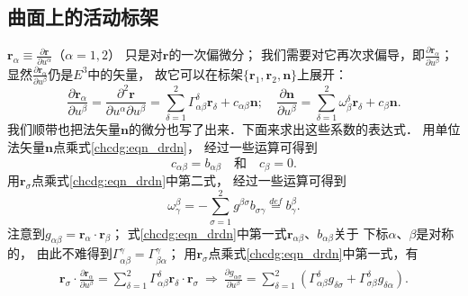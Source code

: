 \subsection{曲面上的活动标架}
$\boldsymbol{r}_\alpha\equiv \frac{\partial \boldsymbol{r}}{\partial u^\alpha}$（$\alpha=1,2$）
只是对$\boldsymbol{r}$的一次偏微分；
我们需要对它再次求偏导，即$\frac{\partial \boldsymbol{r}_\alpha}{\partial u^\beta}$；
显然$\frac{\partial \boldsymbol{r}_\alpha}{\partial u^\beta}$仍是$E^3$中的矢量，
故它可以在标架$\{\boldsymbol{r}_1,\boldsymbol{r}_2,\boldsymbol{n}\}$上展开：
\begin{equation}\label{chcdg:eqn_drdn}
    \frac{\partial \boldsymbol{r}_\alpha}{\partial u^\beta} 
    =\frac{\partial^2 \boldsymbol{r}}{\partial u^\alpha\partial u^\beta}
    = \sum_{\delta=1}^{2} \Gamma_{\alpha \beta}^\delta \boldsymbol{r}_\delta
     + c_{\alpha \beta} \boldsymbol{n};\quad
    \frac{\partial \boldsymbol{n}}{\partial u^\beta}
     = \sum_{\delta=1}^{2} \omega^\delta_\beta \boldsymbol{r}_\delta
     + c_\beta \boldsymbol{n} .
\end{equation}
我们顺带也把法矢量$\boldsymbol{n}$的微分也写了出来．下面来求出这些系数的表达式．
用单位法矢量$\boldsymbol{n}$点乘式\eqref{chcdg:eqn_drdn}，
经过一些运算可得到
\begin{equation}
    c_{\alpha\beta} = b_{\alpha\beta}  \quad\text{和}\quad c_\beta=0.
\end{equation}
用$\boldsymbol{r}_\sigma$点乘式\eqref{chcdg:eqn_drdn}中第二式，
经过一些运算可得到
\begin{equation}
    \omega^\beta_\gamma = - \sum_{\sigma=1}^{2} g^{\beta \sigma} b_{\sigma\gamma}
     \overset{def}{=}b^\beta_\gamma .
\end{equation}
注意到$g_{\alpha \beta}=\boldsymbol{r}_\alpha\cdot \boldsymbol{r}_\beta$；
式\eqref{chcdg:eqn_drdn}中第一式$\boldsymbol{r}_{\alpha \beta}$、$b_{\alpha \beta}$关于
下标$\alpha$、$\beta$是对称的，
由此不难得到$\Gamma^\gamma_{\alpha \beta}=\Gamma^\gamma_{\beta\alpha}$；
用$\boldsymbol{r}_\sigma$点乘式\eqref{chcdg:eqn_drdn}中第一式，有
\begin{align}
    \boldsymbol{r}_\sigma \cdot \frac{\partial \boldsymbol{r}_\alpha}{\partial u^\beta} 
    = \sum_{\delta=1}^{2} \Gamma_{\alpha \beta}^\delta 
    \boldsymbol{r}_\delta\cdot\boldsymbol{r}_\sigma \ \Rightarrow \ 
    \frac{\partial g_{\alpha\sigma}}{\partial u^\beta} =
    \sum_{\delta=1}^{2} \left(\Gamma_{\alpha \beta}^\delta g_{\delta \sigma}
     + \Gamma_{\sigma \beta}^\delta g_{\delta \alpha} \right) . \label{chcdg:eqn_Gg}
\end{align}
